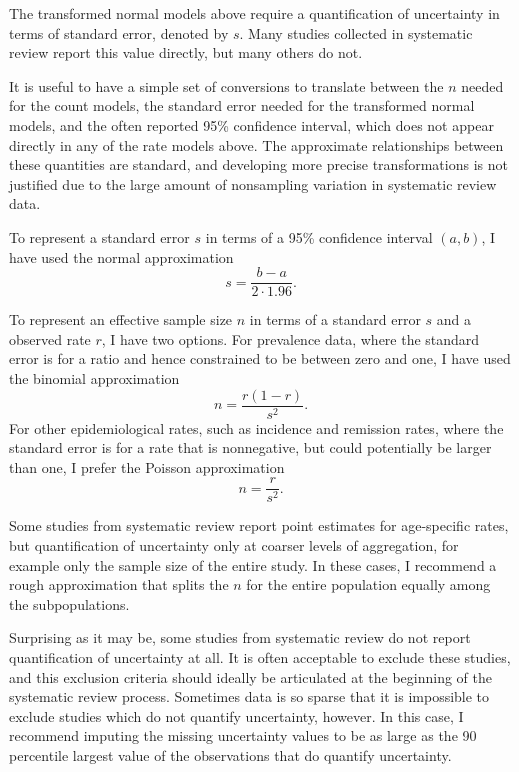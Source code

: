 The transformed normal models above require a quantification of
uncertainty in terms of standard error, denoted by $s$.  Many studies
collected in systematic review report this value directly, but many
others do not.

It is useful to have a simple set of conversions to translate between
the $n$ needed for the count models, the standard error needed for the
transformed normal models, and the often reported 95\% confidence
interval, which does not appear directly in any of the rate models
above. The approximate relationships between these quantities are
standard, and developing more precise transformations is not justified
due to the large amount of nonsampling variation in systematic review
data.

To represent a standard error $s$ in terms of a 95\% confidence
interval $(a,b)$, I have used the normal approximation
\[
s = \frac{b-a}{2\cdot 1.96}.
\]

To represent an effective sample size $n$ in terms of a standard error
$s$ and a observed rate $r$, I have two options.  For prevalence data,
where the standard error is for a ratio and hence constrained to be
between zero and one, I have used the binomial approximation
\[
n = \frac{r(1-r)}{s^2}.
\]
For other epidemiological rates, such as incidence and remission
rates, where the standard error is for a rate that is nonnegative, but
could potentially be larger than one, I prefer the Poisson
approximation
\[
n = \frac{r}{s^2}.
\]

Some studies from systematic review report point estimates for
age-specific rates, but quantification of uncertainty only at coarser
levels of aggregation, for example only the sample size of the entire
study.  In these cases, I recommend a rough approximation that splits
the $n$ for the entire population equally among the subpopulations.

Surprising as it may be, some studies from systematic review do not
report quantification of uncertainty at all.  It is often acceptable
to exclude these studies, and this exclusion criteria should ideally
be articulated at the beginning of the systematic review process.
Sometimes data is so sparse that it is impossible to exclude studies
which do not quantify uncertainty, however.  In this case, I recommend
imputing the missing uncertainty values to be as large as the 90
percentile largest value of the observations that do quantify
uncertainty.



